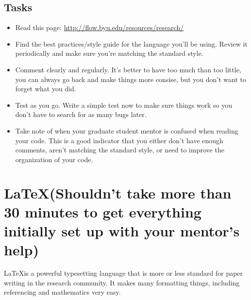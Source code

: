 \documentclass[]{article}%
\begin{document}
\subsection{Tasks}
\begin{itemize}
	\item Read this page: \url{http://flow.byu.edu/resources/research/}
	\item Find the best practices/style guide for the language you'll be using. Review it periodically and make sure you're matching the standard style.
	\item Comment clearly and regularly.  It's better to have too much than too little, you can always go back and make things more consise, but you don't want to forget what you did.
	\item Test as you go.  Write a simple test now to make sure things work so you don't have to search for as many bugs later.
	\item Take note of when your graduate student mentor is confused when reading your code. This is a good indicator that you either don't have enough comments, aren't matching the standard style, or need to improve the organization of your code.
\end{itemize}


\section{\LaTeX (Shouldn't take more than 30 minutes to get everything initially set up with your mentor's help)}
\LaTeX is a powerful typesetting language that is more or less standard for paper writing in the research community.  It makes many formatting things, including referencing and mathematics very easy.
\end{document}
